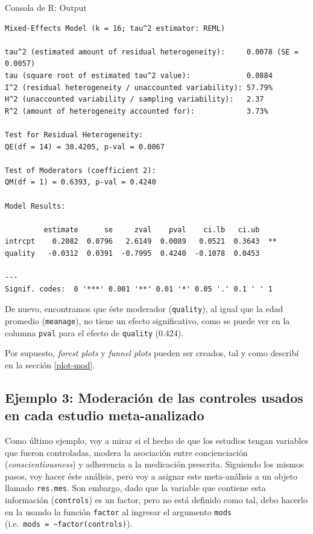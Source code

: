 \documentclass[
  bookmarksnumbered]{article}
\begin{document}
\begin{ROut}{Consola de R: Output~\thetcbcounter}
                \begin{footnotesize}
                \begin{verbatim} 
Mixed-Effects Model (k = 16; tau^2 estimator: REML)

tau^2 (estimated amount of residual heterogeneity):     0.0078 (SE = 0.0057)
tau (square root of estimated tau^2 value):             0.0884
I^2 (residual heterogeneity / unaccounted variability): 57.79%
H^2 (unaccounted variability / sampling variability):   2.37
R^2 (amount of heterogeneity accounted for):            3.73%

Test for Residual Heterogeneity:
QE(df = 14) = 30.4205, p-val = 0.0067

Test of Moderators (coefficient 2):
QM(df = 1) = 0.6393, p-val = 0.4240

Model Results:

         estimate      se     zval    pval    ci.lb   ci.ub 
intrcpt    0.2082  0.0796   2.6149  0.0089   0.0521  0.3643  ** 
quality   -0.0312  0.0391  -0.7995  0.4240  -0.1078  0.0453     

---
Signif. codes:  0 '***' 0.001 '**' 0.01 '*' 0.05 '.' 0.1 ' ' 1
 \end{verbatim}
                \end{footnotesize}
                \end{ROut}

De nuevo, encontramos que éste moderador (\texttt{quality}), al igual que la edad promedio (\texttt{meanage}), no tiene un efecto significativo, como se puede ver en la columna \texttt{pval} para el efecto de \texttt{quality} (0.424).

Por supuesto, \emph{forest plots} y \emph{funnel plots} pueden ser creados, tal y como describí en la sección \ref{plot-mod}.

\hypertarget{ejemplo-3-moderaciuxf3n-de-las-controles-usados-en-cada-estudio-meta-analizado}{%
\subsection{Ejemplo 3: Moderación de las controles usados en cada estudio meta-analizado}\label{ejemplo-3-moderaciuxf3n-de-las-controles-usados-en-cada-estudio-meta-analizado}}

Como último ejemplo, voy a mirar si el hecho de que los estudios tengan variables que fueron controladas, modera la asociación entre concienciación (\emph{conscientiousness}) y adherencia a la medicación prescrita. Siguiendo los mismos pasos, voy hacer éste análisis, pero voy a asignar este meta-análisis a un objeto llamado \texttt{res.mes}. Son embargo, dado que la variable que contiene esta información (\texttt{controls}) es un factor, pero no está definido como tal, debo hacerlo en la usando la función \texttt{factor} al ingresar el argumento \texttt{mods} (i.e.~\texttt{mods\ =\ \textasciitilde{}factor(controls)}).
\end{document}
